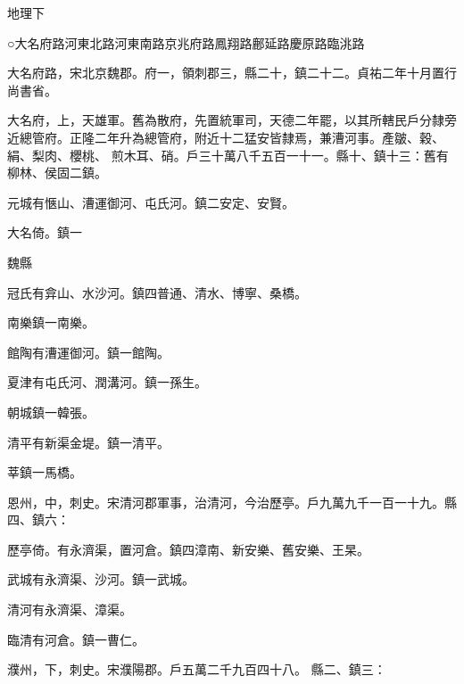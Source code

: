 
\begin{pinyinscope}

 地理下



 ○大名府路河東北路河東南路京兆府路鳳翔路鄜延路慶原路臨洮路



 大名府路，宋北京魏郡。府一，領刺郡三，縣二十，鎮二十二。貞祐二年十月置行尚書省。



 大名府，上，天雄軍。舊為散府，先置統軍司，天德二年罷，以其所轄民戶分隸旁近總管府。正隆二年升為總管府，附近十二猛安皆隸焉，兼漕河事。產皺、穀、絹、梨肉、櫻桃、
 煎木耳、硝。戶三十萬八千五百一十一。縣十、鎮十三：舊有柳林、侯固二鎮。



 元城有愜山、漕運御河、屯氏河。鎮二安定、安賢。



 大名倚。鎮一



 魏縣



 冠氏有弇山、水沙河。鎮四普通、清水、博寧、桑橋。



 南樂鎮一南樂。



 館陶有漕運御河。鎮一館陶。



 夏津有屯氏河、潤溝河。鎮一孫生。



 朝城鎮一韓張。



 清平有新渠金堤。鎮一清平。



 莘鎮一馬橋。



 恩州，中，刺史。宋清河郡軍事，治清河，今治歷亭。戶九萬九千一百一十九。縣四、鎮六：



 歷亭倚。有永濟渠，置河倉。鎮四漳南、新安樂、舊安樂、王杲。



 武城有永濟渠、沙河。鎮一武城。



 清河有永濟渠、漳渠。



 臨清有河倉。鎮一曹仁。



 濮州，下，刺史。宋濮陽郡。戶五萬二千九百四十八。
 縣二、鎮三：




\end{pinyinscope}

